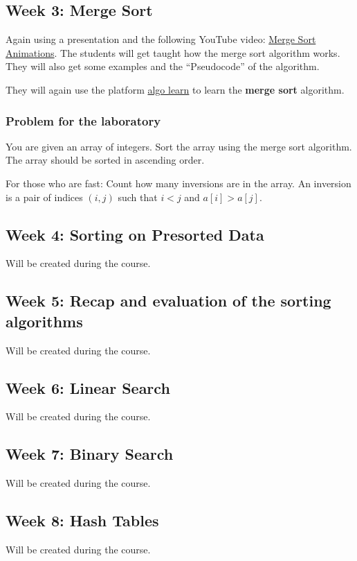 \documentclass[10pt, oneside]{article}
\theoremstyle{remark}
\begin{document}
\subsection{Week 3: Merge Sort}
Again using a presentation and the following YouTube video: \href{https://www.youtube.com/watch?v=ZRPoEKHXTJg}{Merge Sort Animations}. The students will get taught how the merge sort algorithm works. They will also get some examples and the \enquote{Pseudocode} of the algorithm.

They will again use the platform \href{https://tcs.uni-frankfurt.de/algo-learn-testing/refs_heads_feat-bubbleSort/en
}{algo learn} to learn the \textbf{merge sort} algorithm.

\subsubsection*{Problem for the laboratory}
\begin{tcolorbox}
  You are given an array of integers. Sort the array using the merge sort algorithm. The array should be sorted in ascending order. 

  For those who are fast: Count how many inversions are in the array. An inversion is a pair of indices $(i, j)$ such that $i < j$ and $a[i] > a[j]$.
\end{tcolorbox}

\subsection{Week 4: Sorting on Presorted Data}
Will be created during the course.

\subsection{Week 5: Recap and evaluation of the sorting algorithms}
Will be created during the course.

\subsection{Week 6: Linear Search}
Will be created during the course.

\subsection{Week 7: Binary Search}
Will be created during the course.

\subsection{Week 8: Hash Tables}
Will be created during the course.
\end{document}
